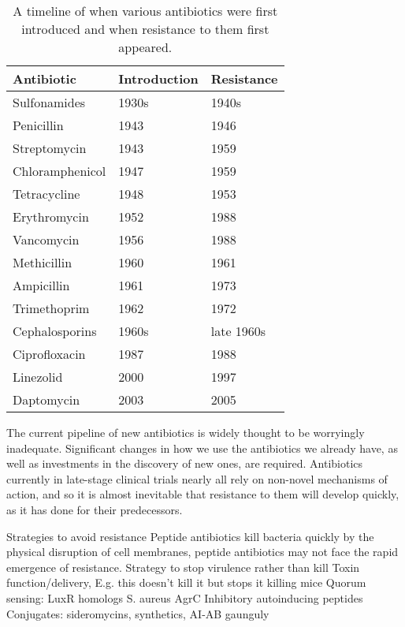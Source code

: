 \begin{table}[H]
  \centering
\begin{tabular}{|p{}|p{}|p{}|}
\hline  
\textbf{Antibiotic} & \textbf{Introduction} & \textbf{Resistance} \\ 
\hline
Sulfonamides & 1930s & 1940s \\ 
\hline 
Penicillin & 1943 & 1946 \\ 
\hline 
Streptomycin & 1943 & 1959 \\ 
\hline 
Chloramphenicol & 1947 & 1959 \\ 
\hline 
Tetracycline & 1948 & 1953 \\ 
\hline 
Erythromycin & 1952 & 1988 \\ 
\hline 
Vancomycin & 1956 & 1988 \\ 
\hline 
Methicillin & 1960 & 1961 \\ 
\hline 
Ampicillin & 1961 & 1973 \\ 
\hline 
Trimethoprim & 1962 & 1972 \\
\hline 
Cephalosporins & 1960s & late 1960s \\
\hline 
Ciprofloxacin & 1987 & 1988 \\
\hline 
Linezolid & 2000 & 1997 \\
\hline
Daptomycin & 2003 & 2005\\
\hline
\end{tabular}
\caption{A timeline of when various antibiotics were first introduced and when resistance to them first appeared\cite{Clatworthy2007,Palumbi2001,Ogle1988,Huovinen2001,Birmingham2003,Lee2007}.\label{tbl:AB_timeline}} 
\end{table}

The current pipeline of new antibiotics is widely thought to be worryingly inadequate\cite{Boucher2009,more}. Significant changes in how we use the antibiotics we already have, as well as investments in the discovery of new ones, are required.
Antibiotics currently in late-stage clinical trials nearly all rely on non-novel mechanisms of action\cite{Boucher2009}, and so it is almost inevitable that resistance to them will develop quickly, as it has done for their predecessors.

Strategies to avoid resistance
Peptide antibiotics kill bacteria quickly by the physical disruption of cell membranes, peptide antibiotics may not face the rapid emergence of resistance.\cite{Hancock1997}
Strategy to stop virulence rather than kill\cite{Clatworthy2007}
Toxin function/delivery, 
E.g. this doesn't kill it but stops it killing mice\cite{Lin2012}
Quorum sensing: LuxR homologs\cite{Clatworthy2007}
S. aureus AgrC Inhibitory autoinducing peptides\cite{Clatworthy2007}
Conjugates: sideromycins, synthetics, AI-AB gaunguly


